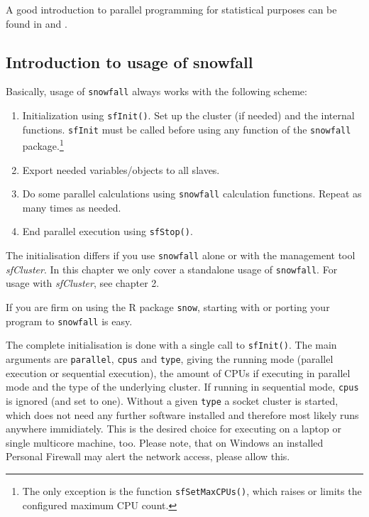 \documentclass[10pt,oneside]{article}
\begin{document}
A good introduction to parallel programming for statistical
purposes can be found in \cite{ROSS_07} and \cite{HANA_STAT04}.

\subsection{Introduction to usage of snowfall}
Basically, usage of \texttt{snowfall} always works with the
following scheme:
\begin{enumerate}
\item
Initialization using \texttt{sfInit()}. Set up the cluster (if needed)
and the internal functions. \texttt{sfInit} must be called before
using any function of the \texttt{snowfall} package.\footnote{The only
exception is the function \texttt{sfSetMaxCPUs()}, which raises or limits
the configured maximum CPU count.}
\item Export needed variables/objects to all slaves.
\item
Do some parallel calculations using \texttt{snowfall} calculation
functions. Repeat as many times as needed.
\item
End parallel execution using \texttt{sfStop()}.
\end{enumerate}

The initialisation differs if you use \texttt{snowfall} alone or with
the management tool \emph{sfCluster}. In this chapter we only cover a
standalone usage of \texttt{snowfall}.
For usage with \emph{sfCluster}, see chapter 2.

If you are firm on using the R package \texttt{snow}, starting with
or porting your program to
\texttt{snowfall} is easy.

The complete initialisation is done with a single call to
\texttt{sfInit()}.
The main arguments are \texttt{parallel}, \texttt{cpus} and \texttt{type},
giving the running mode (parallel execution or sequential execution),
the amount of CPUs if executing in parallel mode and the type of the
underlying cluster.
If running in sequential mode, \texttt{cpus} is ignored (and set
to one).
Without a given \texttt{type} a socket cluster is started, which does not
need any further software installed and therefore most likely runs anywhere
immidiately. This is the desired choice for executing on a laptop or single
multicore machine, too. Please note, that on Windows an installed Personal
Firewall may alert the network access, please allow this.

\end{document}
